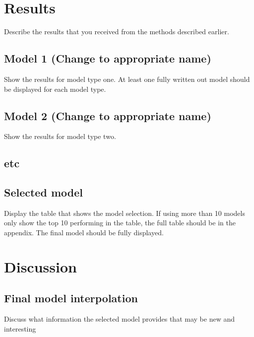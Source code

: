 \documentclass[
  12pt]{article}
\begin{document}
\newpage

\section{Results}\label{sec-results}

Describe the results that you received from the methods described
earlier.

\subsection{Model 1 (Change to appropriate
name)}\label{model-1-change-to-appropriate-name}

Show the results for model type one. At least one fully written out
model should be displayed for each model type.

\subsection{Model 2 (Change to appropriate
name)}\label{model-2-change-to-appropriate-name}

Show the results for model type two.

\subsection{etc}\label{etc}

\subsection{Selected model}\label{selected-model}

Display the table that shows the model selection. If using more than 10
models only show the top 10 performing in the table, the full table
should be in the appendix. The final model should be fully displayed.

\newpage

\section{Discussion}\label{discussion}

\subsection{Final model interpolation}\label{final-model-interpolation}

Discuss what information the selected model provides that may be new and
interesting
\end{document}
